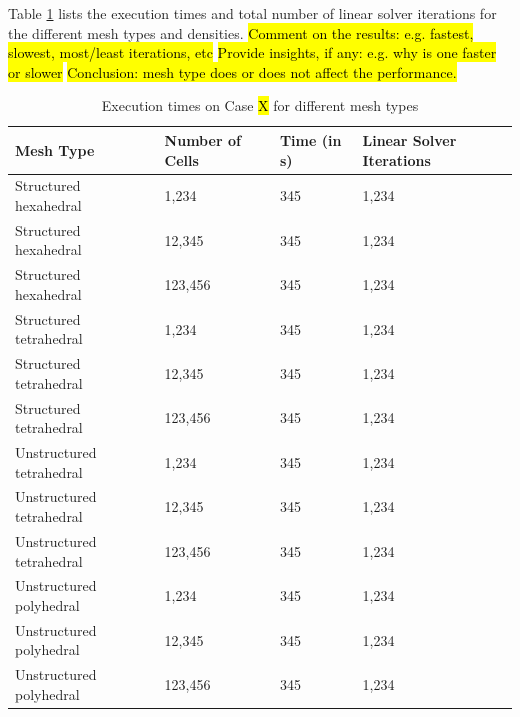 \documentclass[sn-mathphys,Numbered,draft]{sn-jnl}%
\begin{document}
Table \ref{tab:mesh_types} lists the execution times and total number of linear solver iterations for the different mesh types and densities.
\hl{Comment on the results: e.g. fastest, slowest, most/least iterations, etc}
\hl{Provide insights, if any: e.g. why is one faster or slower}
\hl{Conclusion: mesh type does or does not affect the performance.}
\begin{table}[htb]
	\centering
		\begin{tabular}{llll}
			\hline
			Mesh Type & Number of Cells & Time (in s) & Linear Solver Iterations  \\
			\hline 
			Structured hexahedral & 1,234 & 345 & 1,234  \\
			Structured hexahedral & 12,345 & 345 & 1,234  \\
			Structured hexahedral & 123,456 & 345 & 1,234  \\
			Structured tetrahedral & 1,234 & 345 & 1,234  \\
			Structured tetrahedral & 12,345 & 345 & 1,234  \\
			Structured tetrahedral & 123,456 & 345 & 1,234  \\
			Unstructured tetrahedral & 1,234 & 345 & 1,234  \\
			Unstructured tetrahedral & 12,345 & 345 & 1,234  \\
			Unstructured tetrahedral & 123,456 & 345 & 1,234  \\
			Unstructured polyhedral & 1,234 & 345 & 1,234  \\
			Unstructured polyhedral & 12,345 & 345 & 1,234  \\
			Unstructured polyhedral & 123,456 & 345 & 1,234  \\
			\hline
		\end{tabular}
	\caption{Execution times on Case \hl{X} for different mesh types}
	\label{tab:mesh_types}
\end{table}


\end{document}
